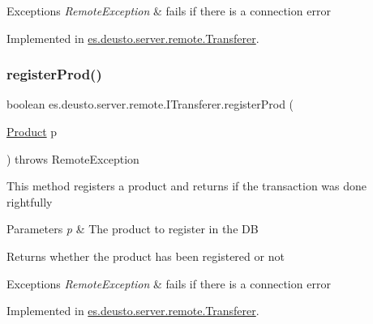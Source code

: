 \begin{DoxyExceptions}{Exceptions}
{\em Remote\+Exception} & fails if there is a connection error \\
\hline
\end{DoxyExceptions}


Implemented in \hyperlink{classes_1_1deusto_1_1server_1_1remote_1_1_transferer_a16976959aeb3080244422aeac061a23b}{es.\+deusto.\+server.\+remote.\+Transferer}.

\mbox{\label{interfacees_1_1deusto_1_1server_1_1remote_1_1_i_transferer_a06629c7021aae4d2ce1a449726102ded}} 
\subsubsection{\texorpdfstring{register\+Prod()}{registerProd()}}
{\footnotesize\ttfamily boolean es.\+deusto.\+server.\+remote.\+I\+Transferer.\+register\+Prod (\begin{DoxyParamCaption}\item[{\hyperlink{classes_1_1deusto_1_1server_1_1db_1_1data_1_1_product}{Product}}]{p }\end{DoxyParamCaption}) throws Remote\+Exception}

This method registers a product and returns if the transaction was done rightfully 
\begin{DoxyParams}{Parameters}
{\em p} & The product to register in the DB \\
\hline
\end{DoxyParams}
\begin{DoxyReturn}{Returns}
whether the product has been registered or not 
\end{DoxyReturn}

\begin{DoxyExceptions}{Exceptions}
{\em Remote\+Exception} & fails if there is a connection error \\
\hline
\end{DoxyExceptions}


Implemented in \hyperlink{classes_1_1deusto_1_1server_1_1remote_1_1_transferer_a64c1f3b57b74106df83335b124937afe}{es.\+deusto.\+server.\+remote.\+Transferer}.

